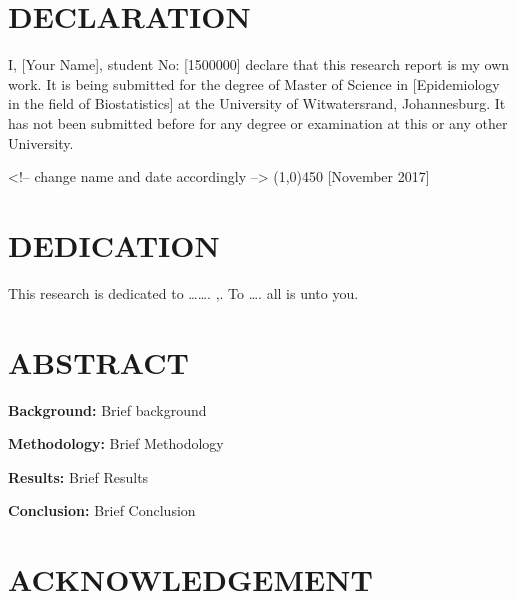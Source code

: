 \documentclass[12pt,]{article}
\begin{document}

\newpage

\section{DECLARATION}\label{declaration}

I, {[}Your Name{]}, student No: {[}1500000{]} declare that this research
report is my own work. It is being submitted for the degree of Master of
Science in {[}Epidemiology in the field of Biostatistics{]} at the
University of Witwatersrand, Johannesburg. It has not been submitted
before for any degree or examination at this or any other University.

\vspace{4 cm}

\begin{centering}


<!-- change name and date accordingly  -->
\line(1,0){450}  \hspace{35pt} [November 2017]

\end{centering}

\newpage

\section{DEDICATION}\label{dedication}

This research is dedicated to \ldots{}\ldots{}. ,. \newline
To \ldots{}. all is unto you.

\newpage

\section{ABSTRACT}\label{abstract}

\textbf{Background:}\newline
Brief background

\textbf{Methodology:} \newline
Brief Methodology

\textbf{Results:}\newline
Brief Results

\textbf{Conclusion:} \newline
Brief Conclusion

\newpage

\section{ACKNOWLEDGEMENT}\label{acknowledgement}
\end{document}
